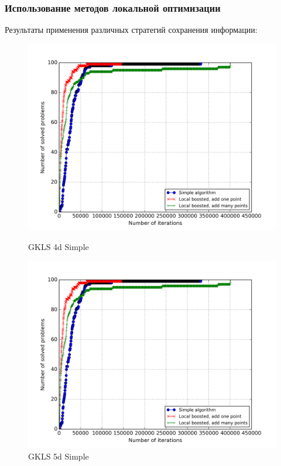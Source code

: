 \documentclass[aspectratio=169]{beamer}
\begin{document}
\begin{frame}
  \frametitle{Использование методов локальной оптимизации}
  Результаты применения различных стратегий сохранения информации:
  \begin{figure}[ht]
        \begin{minipage}[b]{0.49\linewidth}
            \centering
            \includegraphics[width=\textwidth]{local_search_op.png}
            \caption*{GKLS 4d Simple}
        \end{minipage}
        \begin{minipage}[b]{0.49\linewidth}
            \centering
            \includegraphics[width=\textwidth]{local_search_op.png}
            \caption*{GKLS 5d Simple}
        \end{minipage}
    \end{figure}
\end{frame}
\end{document}
